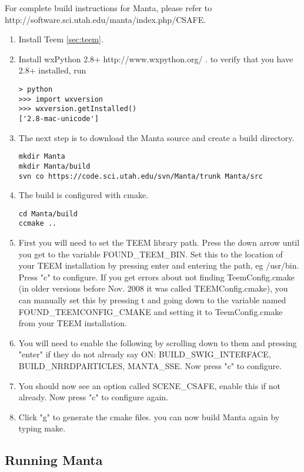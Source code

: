 For complete build instructions for Manta, please refer to
http://software.sci.utah.edu/manta/index.php/CSAFE.  

\begin{enumerate}
\item
Install Teem \ref{sec:teem}.
\item
Install wxPython 2.8+ http://www.wxpython.org/ .  
to verify that you have 2.8+ installed, run
\begin{Verbatim}
> python
>>> import wxversion
>>> wxversion.getInstalled()
['2.8-mac-unicode']
\end{Verbatim}
\item
The next step is to download the Manta source and create a build directory.
\begin{Verbatim}
mkdir Manta
mkdir Manta/build
svn co https://code.sci.utah.edu/svn/Manta/trunk Manta/src
\end{Verbatim}
\item
The build is configured with cmake.
\begin{Verbatim}
cd Manta/build
ccmake ..
\end{Verbatim}
\item
 First you will need to set the TEEM library path. Press the down arrow until you get to the variable FOUND\_TEEM\_BIN. Set this to the location of your TEEM installation by pressing enter and entering the path, eg /usr/bin. Press "c" to configure. If you get errors about not finding TeemConfig.cmake (in older versions before Nov. 2008 it was called TEEMConfig.cmake), you can manually set this by pressing t and going down to the variable named FOUND\_TEEMCONFIG\_CMAKE and setting it to TeemConfig.cmake from your TEEM installation. 
 \item
 You will need to enable the following by scrolling down to them and pressing "enter" if they do not already say ON: BUILD\_SWIG\_INTERFACE, BUILD\_NRRDPARTICLES, MANTA\_SSE. Now press "c" to configure. 
 \item
 You should now see an option called SCENE\_CSAFE, enable this if not already. Now press "c" to configure again. 
 \item
 Click "g" to generate the cmake files. you can now build Manta again by typing make. 
\end{enumerate}

\subsection{Running Manta}

